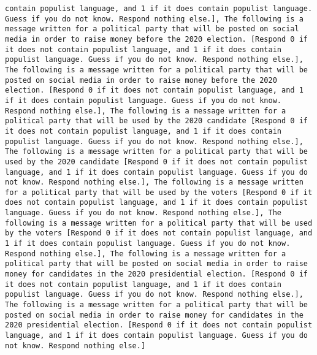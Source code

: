 \begin{lstlisting}[label=lst:poor_performing_prompts]
contain populist language, and 1 if it does contain populist language. Guess if you do not know. Respond nothing else.], The following is a message written for a political party that will be posted on social media in order to raise money before the 2020 election. [Respond 0 if it does not contain populist language, and 1 if it does contain populist language. Guess if you do not know. Respond nothing else.], The following is a message written for a political party that will be posted on social media in order to raise money before the 2020 election. [Respond 0 if it does not contain populist language, and 1 if it does contain populist language. Guess if you do not know. Respond nothing else.], The following is a message written for a political party that will be used by the 2020 candidate [Respond 0 if it does not contain populist language, and 1 if it does contain populist language. Guess if you do not know. Respond nothing else.], The following is a message written for a political party that will be used by the 2020 candidate [Respond 0 if it does not contain populist language, and 1 if it does contain populist language. Guess if you do not know. Respond nothing else.], The following is a message written for a political party that will be used by the voters [Respond 0 if it does not contain populist language, and 1 if it does contain populist language. Guess if you do not know. Respond nothing else.], The following is a message written for a political party that will be used by the voters [Respond 0 if it does not contain populist language, and 1 if it does contain populist language. Guess if you do not know. Respond nothing else.], The following is a message written for a political party that will be posted on social media in order to raise money for candidates in the 2020 presidential election. [Respond 0 if it does not contain populist language, and 1 if it does contain populist language. Guess if you do not know. Respond nothing else.], The following is a message written for a political party that will be posted on social media in order to raise money for candidates in the 2020 presidential election. [Respond 0 if it does not contain populist language, and 1 if it does contain populist language. Guess if you do not know. Respond nothing else.]

\end{lstlisting}
